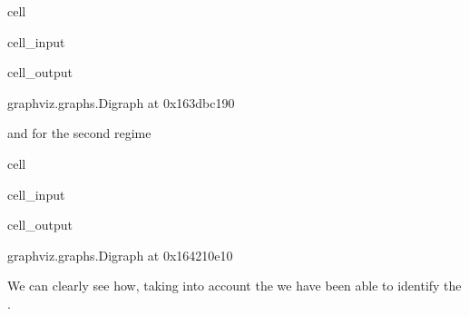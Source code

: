 \documentclass[letterpaper,10pt,english]{jupyterBook}
\begin{document}
\begin{sphinxuseclass}{cell}\begin{sphinxVerbatimInput}

\begin{sphinxuseclass}{cell_input}
\begin{sphinxVerbatim}[commandchars=\\\{\}]
  
\end{sphinxVerbatim}

\end{sphinxuseclass}\end{sphinxVerbatimInput}
\begin{sphinxVerbatimOutput}

\begin{sphinxuseclass}{cell_output}
\begin{sphinxVerbatim}[commandchars=\\\{\}]
\PYGZlt{}graphviz.graphs.Digraph at 0x163dbc190\PYGZgt{}
\end{sphinxVerbatim}

\end{sphinxuseclass}\end{sphinxVerbatimOutput}

\end{sphinxuseclass}
\sphinxAtStartPar
and for the second regime

\begin{sphinxuseclass}{cell}\begin{sphinxVerbatimInput}

\begin{sphinxuseclass}{cell_input}
\begin{sphinxVerbatim}[commandchars=\\\{\}]
 
\end{sphinxVerbatim}

\end{sphinxuseclass}\end{sphinxVerbatimInput}
\begin{sphinxVerbatimOutput}

\begin{sphinxuseclass}{cell_output}
\begin{sphinxVerbatim}[commandchars=\\\{\}]
\PYGZlt{}graphviz.graphs.Digraph at 0x164210e10\PYGZgt{}
\end{sphinxVerbatim}

\end{sphinxuseclass}\end{sphinxVerbatimOutput}

\end{sphinxuseclass}
\sphinxAtStartPar
We can clearly see how, taking into account the  we have been able to identify the .
\end{document}
